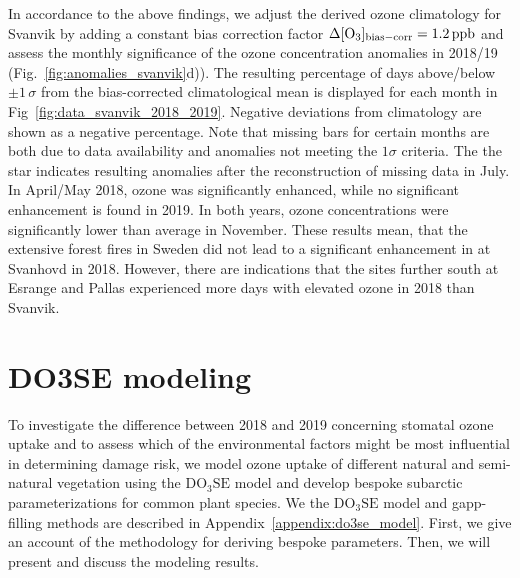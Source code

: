 \documentclass[bg, manuscript]{copernicus}
\begin{document}
In accordance to the above findings, we adjust the derived ozone climatology for Svanvik by adding a constant bias correction factor $\Delta\chem{[O_3]_\mathrm{bias-corr}} = 1.2\,\unit{ppb}$ and assess the monthly significance of the ozone concentration anomalies in 2018/19 (Fig.~\ref{fig:anomalies_svanvik}d)). The resulting percentage of days above/below $\pm 1\,\sigma$ from the bias-corrected climatological mean is displayed for each month in Fig~\ref{fig:data_svanvik_2018_2019}. Negative deviations from climatology are shown as a negative percentage. Note that missing bars for certain months are both due to data availability and anomalies not meeting the $1\sigma$ criteria. The the star indicates resulting anomalies after the reconstruction of missing data in July. In April/May 2018, ozone was significantly enhanced, while no significant enhancement is found in 2019. In both years, ozone concentrations were significantly lower than average in November. These results mean, that the extensive forest fires in Sweden did not lead to a significant enhancement in \chem{[O_3]} at Svanhovd in 2018. However, there are indications that the sites further south at Esrange and Pallas experienced more days with elevated ozone in 2018 than Svanvik.


\section{DO3SE modeling}
\label{sec:do3se}
To investigate the difference between 2018 and 2019 concerning stomatal ozone uptake and to assess which of the environmental factors might be most influential in determining  damage risk, we model ozone uptake of different natural and semi-natural vegetation using the $\mathrm{DO_3SE}$ model and develop bespoke subarctic parameterizations for common plant species. We the $\mathrm{DO_3SE}$ model and gapp-filling methods are described in Appendix~\ref{appendix:do3se_model}. First, we give an account of the methodology for deriving bespoke parameters. Then, we will present and discuss the modeling results.
\end{document}
